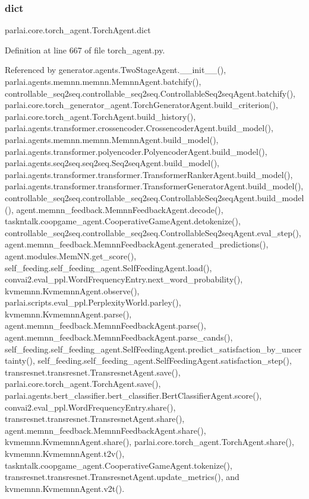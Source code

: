 \subsubsection{\texorpdfstring{dict}{dict}}
{\footnotesize\ttfamily parlai.\+core.\+torch\+\_\+agent.\+Torch\+Agent.\+dict}



Definition at line 667 of file torch\+\_\+agent.\+py.



Referenced by generator.\+agents.\+Two\+Stage\+Agent.\+\_\+\+\_\+init\+\_\+\+\_\+(), parlai.\+agents.\+memnn.\+memnn.\+Memnn\+Agent.\+batchify(), controllable\+\_\+seq2seq.\+controllable\+\_\+seq2seq.\+Controllable\+Seq2seq\+Agent.\+batchify(), parlai.\+core.\+torch\+\_\+generator\+\_\+agent.\+Torch\+Generator\+Agent.\+build\+\_\+criterion(), parlai.\+core.\+torch\+\_\+agent.\+Torch\+Agent.\+build\+\_\+history(), parlai.\+agents.\+transformer.\+crossencoder.\+Crossencoder\+Agent.\+build\+\_\+model(), parlai.\+agents.\+memnn.\+memnn.\+Memnn\+Agent.\+build\+\_\+model(), parlai.\+agents.\+transformer.\+polyencoder.\+Polyencoder\+Agent.\+build\+\_\+model(), parlai.\+agents.\+seq2seq.\+seq2seq.\+Seq2seq\+Agent.\+build\+\_\+model(), parlai.\+agents.\+transformer.\+transformer.\+Transformer\+Ranker\+Agent.\+build\+\_\+model(), parlai.\+agents.\+transformer.\+transformer.\+Transformer\+Generator\+Agent.\+build\+\_\+model(), controllable\+\_\+seq2seq.\+controllable\+\_\+seq2seq.\+Controllable\+Seq2seq\+Agent.\+build\+\_\+model(), agent.\+memnn\+\_\+feedback.\+Memnn\+Feedback\+Agent.\+decode(), taskntalk.\+coopgame\+\_\+agent.\+Cooperative\+Game\+Agent.\+detokenize(), controllable\+\_\+seq2seq.\+controllable\+\_\+seq2seq.\+Controllable\+Seq2seq\+Agent.\+eval\+\_\+step(), agent.\+memnn\+\_\+feedback.\+Memnn\+Feedback\+Agent.\+generated\+\_\+predictions(), agent.\+modules.\+Mem\+N\+N.\+get\+\_\+score(), self\+\_\+feeding.\+self\+\_\+feeding\+\_\+agent.\+Self\+Feeding\+Agent.\+load(), convai2.\+eval\+\_\+ppl.\+Word\+Frequency\+Entry.\+next\+\_\+word\+\_\+probability(), kvmemnn.\+Kvmemnn\+Agent.\+observe(), parlai.\+scripts.\+eval\+\_\+ppl.\+Perplexity\+World.\+parley(), kvmemnn.\+Kvmemnn\+Agent.\+parse(), agent.\+memnn\+\_\+feedback.\+Memnn\+Feedback\+Agent.\+parse(), agent.\+memnn\+\_\+feedback.\+Memnn\+Feedback\+Agent.\+parse\+\_\+cands(), self\+\_\+feeding.\+self\+\_\+feeding\+\_\+agent.\+Self\+Feeding\+Agent.\+predict\+\_\+satisfaction\+\_\+by\+\_\+uncertainty(), self\+\_\+feeding.\+self\+\_\+feeding\+\_\+agent.\+Self\+Feeding\+Agent.\+satisfaction\+\_\+step(), transresnet.\+transresnet.\+Transresnet\+Agent.\+save(), parlai.\+core.\+torch\+\_\+agent.\+Torch\+Agent.\+save(), parlai.\+agents.\+bert\+\_\+classifier.\+bert\+\_\+classifier.\+Bert\+Classifier\+Agent.\+score(), convai2.\+eval\+\_\+ppl.\+Word\+Frequency\+Entry.\+share(), transresnet.\+transresnet.\+Transresnet\+Agent.\+share(), agent.\+memnn\+\_\+feedback.\+Memnn\+Feedback\+Agent.\+share(), kvmemnn.\+Kvmemnn\+Agent.\+share(), parlai.\+core.\+torch\+\_\+agent.\+Torch\+Agent.\+share(), kvmemnn.\+Kvmemnn\+Agent.\+t2v(), taskntalk.\+coopgame\+\_\+agent.\+Cooperative\+Game\+Agent.\+tokenize(), transresnet.\+transresnet.\+Transresnet\+Agent.\+update\+\_\+metrics(), and kvmemnn.\+Kvmemnn\+Agent.\+v2t().

